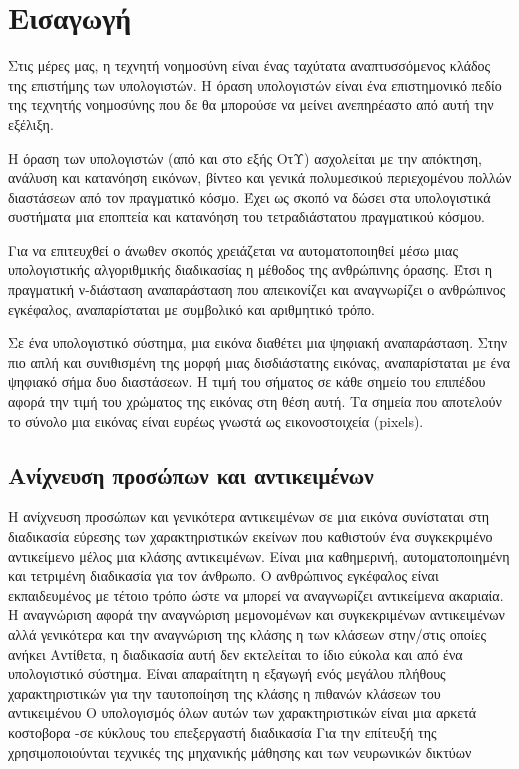 \chapter{Εισαγωγή}\label{ch:introduction}

Στις μέρες μας, η τεχνητή νοημοσύνη είναι ένας ταχύτατα αναπτυσσόμενος κλάδος
της επιστήμης των υπολογιστών. Η όραση υπολογιστών είναι ένα επιστημονικό πεδίο
της τεχνητής νοημοσύνης που δε θα μπορούσε να μείνει ανεπηρέαστο από αυτή την
εξέλιξη.

Η όραση των υπολογιστών (από και στο εξής ΟτΥ) ασχολείται με την απόκτηση,
ανάλυση και κατανόηση εικόνων, βίντεο και γενικά πολυμεσικού περιεχομένου
πολλών διαστάσεων από τον πραγματικό κόσμο. Έχει ως σκοπό να δώσει στα
υπολογιστικά συστήματα μια εποπτεία και κατανόηση του τετραδιάστατου
πραγματικού κόσμου.

Για να επιτευχθεί ο άνωθεν σκοπός χρειάζεται να αυτοματοποιηθεί μέσω μιας
υπολογιστικής αλγοριθμικής διαδικασίας η μέθοδος της ανθρώπινης όρασης. Έτσι
η πραγματική ν-διάσταση αναπαράσταση που απεικονίζει και αναγνωρίζει ο
ανθρώπινος εγκέφαλος, αναπαρίσταται με συμβολικό και αριθμητικό τρόπο.

Σε ένα υπολογιστικό σύστημα, μια εικόνα διαθέτει μια ψηφιακή αναπαράσταση. Στην πιο
απλή και συνιθισμένη της μορφή μιας δισδιάστατης εικόνας, αναπαρίσταται με ένα
ψηφιακό σήμα δυο διαστάσεων. Η τιμή του σήματος σε κάθε σημείο του επιπέδου
αφορά την τιμή του χρώματος της εικόνας στη θέση αυτή. Τα σημεία που αποτελούν το
σύνολο μια εικόνας είναι ευρέως γνωστά ως εικονοστοιχεία (pixels).

\section{Ανίχνευση προσώπων και αντικειμένων}
Η ανίχνευση προσώπων και γενικότερα αντικειμένων σε μια εικόνα συνίσταται στη
διαδικασία εύρεσης των χαρακτηριστικών εκείνων που καθιστούν ένα συγκεκριμένο
αντικείμενο μέλος μια κλάσης αντικειμένων. Είναι μια καθημερινή, αυτοματοποιημένη
και τετριμένη διαδικασία για τον άνθρωπο. Ο ανθρώπινος εγκέφαλος είναι
εκπαιδευμένος με τέτοιο τρόπο ώστε να μπορεί να αναγνωρίζει αντικείμενα ακαριαία.
Η αναγνώριση  αφορά την αναγνώριση μεμονομένων και συγκεκριμένων αντικειμένων
αλλά γενικότερα και την αναγνώριση της κλάσης η των κλάσεων στην/στις οποίες ανήκει
Αντίθετα, η διαδικασία αυτή δεν εκτελείται το ίδιο εύκολα και από ένα υπολογιστικό σύστημα.
Είναι απαραίτητη η εξαγωγή ενός μεγάλου πλήθους χαρακτηριστικών για την ταυτοποίηση
της κλάσης η πιθανών κλάσεων του αντικειμένου Ο υπολογισμός όλων αυτών των
χαρακτηριστικών είναι μια αρκετά κοστοβορα -σε κύκλους του επεξεργαστή διαδικασία
Για την επίτευξή της χρησιμοποιούνται τεχνικές της μηχανικής μάθησης και των
νευρωνικών δικτύων

